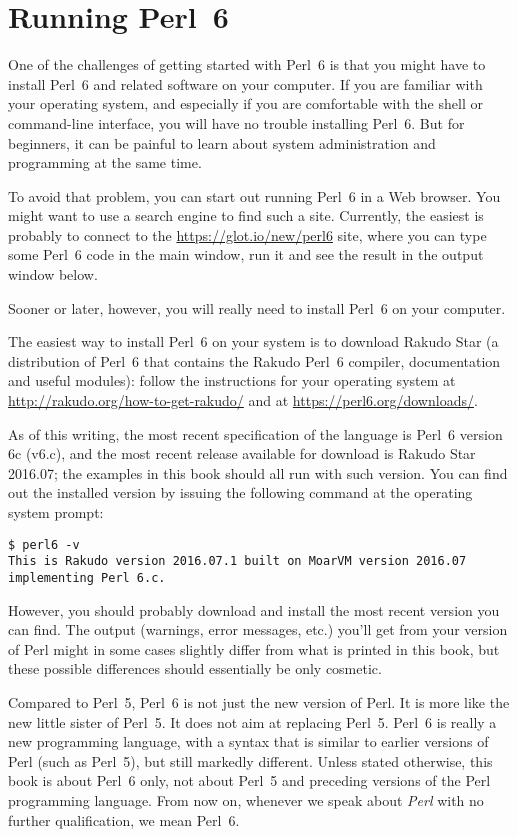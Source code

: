\section{Running Perl~6}
\label{running_perl_6}

One of the challenges of getting started with Perl~6 is that you
might have to install Perl~6 and related software on your computer. 
If you are familiar with your operating system, and especially
if you are comfortable with the shell or command-line interface, 
you will have no trouble installing Perl~6.  But for beginners, 
it can be painful to learn about system administration and 
programming at the same time.

To avoid that problem, you can start out running Perl~6 
in a Web browser. You might want to use a search engine 
to find such a site. Currently, the easiest is probably 
to connect to the \url{https://glot.io/new/perl6} site, 
where you can type some Perl~6 code in the main window, run 
it and see the result in the output window below.

Sooner or later, however, you will really need to install 
Perl~6 on your computer.

The easiest way to install Perl~6 on your system is to 
download Rakudo Star (a distribution of Perl~6 that contains 
the Rakudo Perl~6 compiler, documentation and useful modules): 
follow the instructions for your operating system at 
\url{http://rakudo.org/how-to-get-rakudo/} and at 
\url{https://perl6.org/downloads/}. 

As of this writing, the most recent specification of 
the language is Perl~6 version 6c (v6.c), and the most 
recent release available for download is Rakudo Star 2016.07; 
the examples in this book should 
all run with such version. You can find out the installed 
version by issuing the following command at the operating 
system prompt:
\begin{verbatim}
$ perl6 -v
This is Rakudo version 2016.07.1 built on MoarVM version 2016.07
implementing Perl 6.c.
\end{verbatim}

However, you should probably download and install the most recent 
version you can find. The output (warnings, error messages, 
etc.) you'll get from your version of Perl might in some 
cases slightly differ from what is printed in this book, 
but these possible differences should essentially be 
only cosmetic. 

Compared to Perl~5, Perl~6 is not just the new version of Perl. 
It is more like the new little sister of Perl~5. It does not 
aim at replacing Perl~5. Perl~6 is really a new programming language, 
with a syntax that is similar to earlier versions of 
Perl (such as Perl~5), but still markedly different. Unless 
stated otherwise, this book is about Perl~6 only, not about Perl~5 
and preceding versions of the Perl programming language. From now on, 
whenever we speak about \emph{Perl} with no further qualification, 
we mean Perl~6.

